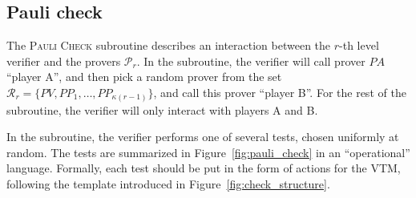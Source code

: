 
\subsection{Pauli check}
\label{sec:pauli_check}

The \textsc{Pauli Check} subroutine describes an interaction between the $r$-th level verifier and the provers $\mathcal{P}_r$. In the subroutine, the verifier will call prover $PA$ ``player A'', and then pick a random prover from the set $\mathcal{R}_r = \{ PV, PP_1,\ldots,PP_{\kappa(r-1)}\}$, and call this prover ``player B''. For the rest of the subroutine, the verifier will only interact with players A and B. 

In the subroutine, the verifier performs one of several tests, chosen uniformly at random. The tests are summarized in Figure~\ref{fig:pauli_check} in an ``operational'' language. Formally, each test should be put in the form of actions for the VTM, following the template introduced in Figure~\ref{fig:check_structure}. 

